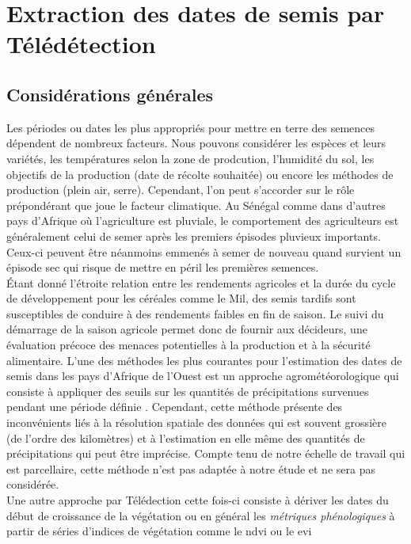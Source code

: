 \section{Extraction des dates de semis par Télédétection}
  
  \subsection{Considérations générales} \label{general}
  
Les périodes ou dates les plus appropriés pour mettre en terre des semences dépendent de nombreux facteurs.  Nous pouvons considérer les espèces et leurs variétés, les températures 
selon la zone de prodcution, l'humidité du sol, les objectifs de la production (date de récolte souhaitée) ou encore les méthodes de production (plein air, serre). Cependant, l'on peut
s'accorder sur le rôle prépondérant que joue le facteur climatique. Au Sénégal comme dans d'autres pays d'Afrique où l'agriculture est pluviale, le comportement des agriculteurs est
généralement celui de semer après les premiers épisodes pluvieux importants. Ceux-ci peuvent être néanmoins emmenés à semer de nouveau quand survient un épisode sec qui risque de
mettre en péril les premières semences.\\ \'Etant donné l'étroite relation entre les rendements agricoles et la durée du cycle de développement pour les céréales comme le Mil, 
des semis tardifs sont susceptibles de 
conduire à des rendements faibles en fin de saison. Le suivi du démarrage de la saison agricole permet donc de fournir aux décideurs, une évaluation précoce des menaces potentielles 
à la production et à la sécurité alimentaire. L'une des méthodes les plus courantes pour l'estimation des dates de semis dans les pays d'Afrique de l'Ouest est un approche agrométéorologique 
qui consiste à appliquer des seuils sur les quantités de précipitations survenues pendant une période définie \citep{Marinho2014}. Cependant, cette méthode présente des inconvénients liés 
à la résolution spatiale des données qui est souvent grossière (de l'ordre des kilomètres) et à l'estimation en elle même des quantités de précipitations qui peut être imprécise. 
Compte tenu de notre échelle de travail qui est parcellaire, cette méthode n'est pas adaptée à notre étude et ne sera pas considérée. \\Une autre approche par Télédection cette fois-ci
consiste à dériver les dates du début de croissance de la végétation ou en général les \emph{métriques phénologiques} à partir de séries d'indices de végétation comme le \acrshort{ndvi} ou le \acrshort{evi} 
